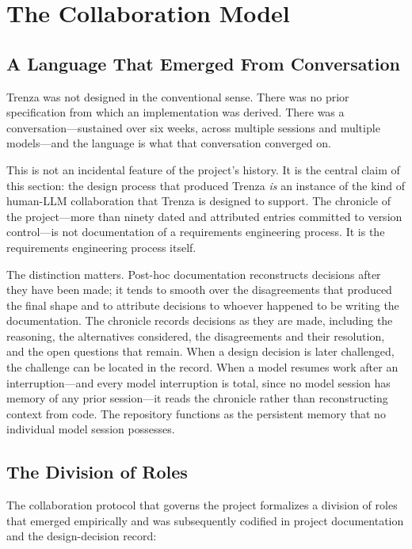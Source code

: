 \section{The Collaboration Model}
\label{sec:collaboration}

\subsection{A Language That Emerged From Conversation}
\label{sec:conversation}

Trenza was not designed in the conventional sense. There was no prior
specification from which an implementation was derived. There was a
conversation---sustained over six weeks, across multiple sessions and multiple
models---and the language is what that conversation converged on.

This is not an incidental feature of the project's history. It is the central
claim of this section: the design process that produced Trenza \emph{is} an
instance of the kind of human-LLM collaboration that Trenza is designed to
support. The chronicle of the project---more than ninety dated and attributed
entries committed to version control---is not documentation of a requirements
engineering process. It is the requirements engineering process itself.

The distinction matters. Post-hoc documentation reconstructs decisions after
they have been made; it tends to smooth over the disagreements that produced
the final shape and to attribute decisions to whoever happened to be writing
the documentation. The chronicle records decisions as they are made, including
the reasoning, the alternatives considered, the disagreements and their
resolution, and the open questions that remain. When a design decision is later
challenged, the challenge can be located in the record. When a model resumes
work after an interruption---and every model interruption is total, since no
model session has memory of any prior session---it reads the chronicle rather
than reconstructing context from code. The repository functions as the
persistent memory that no individual model session possesses.

\subsection{The Division of Roles}
\label{sec:roles}

The collaboration protocol that governs the project formalizes a division of
roles that emerged empirically and was subsequently codified in project
documentation and the design-decision record:

